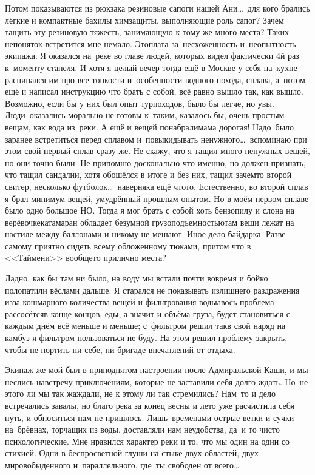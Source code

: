Потом показываются из рюкзака резиновые сапоги нашей Ани\ldots~для кого брались лёгкие и компактные бахилы химзащиты, выполняющие роль сапог? Зачем тащить эту резиновую тяжесть, занимающую к тому же много места? Таких непоняток встретится мне немало. Это\mdash плата за~несхоженность и~неопытность экипажа. Я оказался на~реке во главе людей, которых видел фактически 4\sdash й раз к~моменту стапеля. И хотя я целый вечер тогда ещё в Москве у себя на~кухне распинался им про все тонкости и~особенности водного похода, сплава, а~потом ещё и написал инструкцию что брать с собой, всё равно вышло так, как вышло. Возможно, если бы у них был опыт турпоходов, было бы легче, но увы. Люди~оказались морально не готовы к~таким, казалось бы, очень простым вещам, как вода из~реки. А ещё и вещей понабрали\mdash мама дорогая! Надо~было заранее встретиться перед сплавом и~повыкидывать ненужного\ldots~вспоминаю при этом свой первый сплав сразу же. Не скажу, что я тащил много ненужных вещей, но они точно были. Не припомню досконально что именно, но должен признать, что тащил сандалии, хотя обошёлся в итоге и без них, тащил зачем\sdash то второй свитер, несколько футболок\ldots~наверняка ещё что\sdash то. Естественно, во второй сплав я брал минимум вещей, умудрённый прошлым опытом. Но в моём первом сплаве было одно большое НО. Тогда я мог брать с собой хоть бензопилу и слона на верёвочке\mdash катамаран обладает безумной грузоподъемностью\mdash там вещи лежат на настиле между баллонами и никому не мешают. Иное дело байдарка. Разве самому приятно сидеть всему обложенному тюками, притом что в <<Таймени>> вообще\sdash то прилично места? 

Ладно, как бы там ни было, на воду мы встали почти вовремя и бойко полопатили вёслами дальше. Я старался не показывать излишнего раздражения из\sdash за кошмарного количества вещей и фильтрования воды\mdash авось проблема рассосётся\mdash в конце концов, еды, а значит и объёма груза, будет становиться с каждым днём всё меньше и меньше; с~фильтром решил так\mdash в свой наряд на камбуз я фильтром пользоваться не буду. На этом решил проблему закрыть, чтобы не портить ни себе, ни бригаде впечатлений от отдыха.

Экипаж же мой был в приподнятом настроении после Адмиральской Каши, и мы неслись навстречу приключениям, которые не заставили себя долго ждать. Но~не этого ли мы так жаждали, не к этому ли так стремились? Нам~то и дело встречались завалы, но благо река за конец весны и лето уже расчистила себя путь, и обноситься нам не пришлось. Лишь~временами острые ветки и сучки на~брёвнах, торчащих из воды, доставляли нам неудобства, да~и то чисто психологические. Мне нравился характер реки и то, что мы один на один со стихией. Одни в беспросветной глуши на стыке двух областей, двух миров\mdash обыденного и~параллельного, где~ты свободен от всего\ldots~

